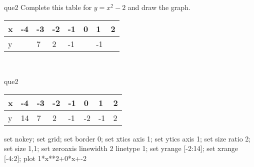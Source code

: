 \documentclass[13.5pt, varwidth=true]{beamer}
\begin{document}
\begin{frame}[shrink=19,fragile]
	\begin{beamercolorbox}[rounded=true, left, shadow=true,wd=14.8cm]{que2}
		 Complete this table for $y = x^{2} - 2$ and draw the graph. \\[0.3cm] \renewcommand{\arraystretch}{1.2}\begin{tabular}{|C|C|C|C|C|C|C|C|} \hline x & -4 & -3 & -2 & -1 & 0 & 1 & 2 \\ \hline y &  & 7 & 2 & -1 &  & -1 & \\ \hline \end{tabular}\\[0.3cm]
	\end{beamercolorbox}
\end{frame}
\begin{frame}[shrink=19,fragile]
	\begin{beamercolorbox}[rounded=true, left, shadow=true,wd=14.8cm]{que2}
		\renewcommand{\arraystretch}{1.2}\begin{tabular}{|C|C|C|C|C|C|C|C|} \hline x & -4 & -3 & -2 & -1 & 0 & 1 & 2 \\ \hline y & 14 & 7 & 2 & -1 & -2 & -1 & 2\\ \hline \end{tabular}\begin{gnuplot}[terminal=pdf] set nokey; set grid; set border 0; set xtics axis 1; set ytics axis 1; set size ratio 2; set size 1,1; set zeroaxis linewidth 2 linetype 1; set yrange [-2:14]; set xrange [-4:2]; plot 1*x**2+0*x+-2 \end{gnuplot}
	\end{beamercolorbox}
\end{frame}
\end{document}
